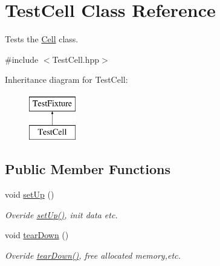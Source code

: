 \hypertarget{class_test_cell}{}\section{Test\+Cell Class Reference}
\label{class_test_cell}


Tests the \hyperlink{class_cell}{Cell} class.  




{\ttfamily \#include $<$Test\+Cell.\+hpp$>$}

Inheritance diagram for Test\+Cell\+:\begin{figure}[H]
\begin{center}
\leavevmode
\includegraphics[height=2.000000cm]{class_test_cell}
\end{center}
\end{figure}
\subsection*{Public Member Functions}
\begin{DoxyCompactItemize}
\item 
\mbox{\label{class_test_cell_a2b9eac7e600f08cff408df54562daa61}} 
void \hyperlink{class_test_cell_a2b9eac7e600f08cff408df54562daa61}{set\+Up} ()
\begin{DoxyCompactList}\small\item\em Overide \hyperlink{class_test_cell_a2b9eac7e600f08cff408df54562daa61}{set\+Up()}, init data etc. \end{DoxyCompactList}\item 
\mbox{\label{class_test_cell_a2ecd29c5f60aa63425c590b6399c0db0}} 
void \hyperlink{class_test_cell_a2ecd29c5f60aa63425c590b6399c0db0}{tear\+Down} ()
\begin{DoxyCompactList}\small\item\em Overide \hyperlink{class_test_cell_a2ecd29c5f60aa63425c590b6399c0db0}{tear\+Down()}, free allocated memory,etc. \end{DoxyCompactList}\end{DoxyCompactItemize}

